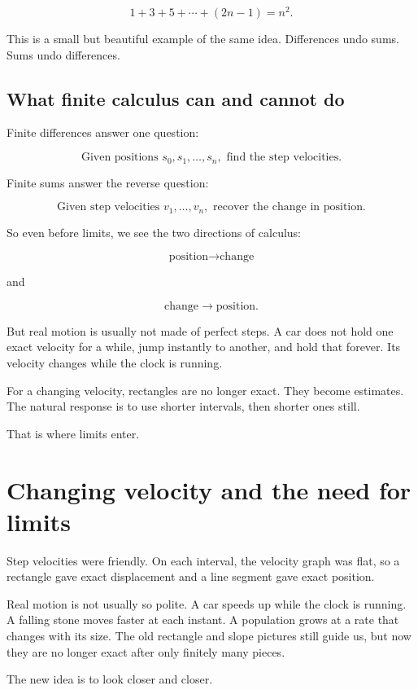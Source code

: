 \[
\boxed{1+3+5+\cdots+(2n-1)=n^2.}
\]

This is a small but beautiful example of the same idea. Differences undo sums. Sums undo differences.

\subsection{What finite calculus can and cannot do}

Finite differences answer one question:

\[
\text{Given positions }s_0,s_1,\ldots,s_n,\text{ find the step velocities.}
\]

Finite sums answer the reverse question:

\[
\text{Given step velocities }v_1,\ldots,v_n,\text{ recover the change in position.}
\]

So even before limits, we see the two directions of calculus:

\[
\text{position}\longrightarrow \text{change}
\]

and

\[
\text{change}\longrightarrow \text{position}.
\]

But real motion is usually not made of perfect steps. A car does not hold one exact velocity for a while, jump instantly to another, and hold that forever. Its velocity changes while the clock is running.

For a changing velocity, rectangles are no longer exact. They become estimates. The natural response is to use shorter intervals, then shorter ones still.

That is where limits enter.
\section{Changing velocity and the need for limits}
\label{sec:changing-velocity-limits}

Step velocities were friendly. On each interval, the velocity graph was flat, so a rectangle gave exact displacement and a line segment gave exact position.

Real motion is not usually so polite. A car speeds up while the clock is running. A falling stone moves faster at each instant. A population grows at a rate that changes with its size. The old rectangle and slope pictures still guide us, but now they are no longer exact after only finitely many pieces.

The new idea is to look closer and closer.

